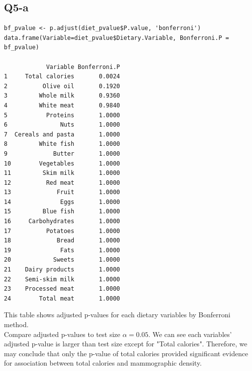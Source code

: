 \documentclass[11pt,letterpaper]{article}
\begin{document}
\subsection*{Q5-a}
\begin{verbatim}
bf_pvalue <- p.adjust(diet_pvalue$P.value, 'bonferroni')
data.frame(Variable=diet_pvalue$Dietary.Variable, Bonferroni.P = bf_pvalue)

            Variable Bonferroni.P
1     Total calories       0.0024
2          Olive oil       0.1920
3         Whole milk       0.9360
4         White meat       0.9840
5           Proteins       1.0000
6               Nuts       1.0000
7  Cereals and pasta       1.0000
8         White fish       1.0000
9             Butter       1.0000
10        Vegetables       1.0000
11         Skim milk       1.0000
12          Red meat       1.0000
13             Fruit       1.0000
14              Eggs       1.0000
15         Blue fish       1.0000
16     Carbohydrates       1.0000
17          Potatoes       1.0000
18             Bread       1.0000
19              Fats       1.0000
20            Sweets       1.0000
21    Dairy products       1.0000
22    Semi-skim milk       1.0000
23    Processed meat       1.0000
24        Total meat       1.0000
\end{verbatim}

\noindent This table shows adjusted p-values for each dietary variables by Bonferroni method. \\

\noindent Compare adjusted p-values to test size $\alpha = 0.05$. We can see each variables' adjusted p-value is larger than test size except for "Total calories". Therefore, we may conclude that only the p-value of total calories provided significant evidence for association between total calories and mammographic density. 

\newpage
\end{document}
